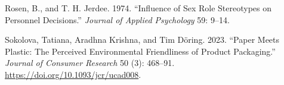\documentclass[
  11pt,
  letterpaper,
]{scrbook}
\newlength{\cslhangindent}
\newenvironment{CSLReferences}[2] %
 {\begin{list}{}{%
  \setlength{\itemindent}{0pt}
  \setlength{\leftmargin}{0pt}
  \setlength{\parsep}{0pt}
  \ifodd #1
   \setlength{\leftmargin}{\cslhangindent}
   \setlength{\itemindent}{-1\cslhangindent}
  \fi
  \setlength{\itemsep}{#2\baselineskip}}}
 {\end{list}}
\theoremstyle{definition}
\theoremstyle{definition}
\theoremstyle{plain}
\theoremstyle{remark}
\begin{document}
\begin{CSLReferences}{1}{0}
Rosen, B., and T. H. Jerdee. 1974. {``Influence of Sex Role Stereotypes
on Personnel Decisions.''} \emph{Journal of Applied Psychology} 59:
9--14.

Sokolova, Tatiana, Aradhna Krishna, and Tim Döring. 2023. {``Paper Meets
Plastic: The Perceived Environmental Friendliness of Product
Packaging.''} \emph{Journal of Consumer Research} 50 (3): 468--91.
\url{https://doi.org/10.1093/jcr/ucad008}.

\end{CSLReferences}


\backmatter
\end{document}
